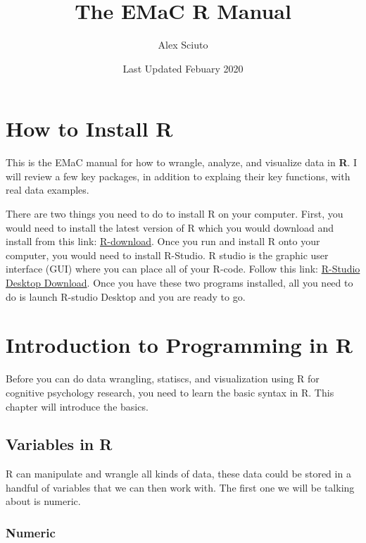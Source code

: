 \documentclass[
]{book}
\title{The EMaC R Manual}
\author{Alex Sciuto}
\date{Last Updated Febuary 2020}
\begin{document}
\maketitle

{
\setcounter{tocdepth}{1}
\tableofcontents
}
\hypertarget{download}{%
\chapter{How to Install R}\label{download}}

This is the EMaC manual for how to wrangle, analyze, and visualize data in \textbf{R}. I will review a few key packages, in addition to explaing their key functions, with real data examples.

There are two things you need to do to install R on your computer. First, you would need to install the latest version of R which you would download and install from this link: \href{https://cloud.r-project.org/}{R-download}. Once you run and install R onto your computer, you would need to install R-Studio. R studio is the graphic user interface (GUI) where you can place all of your R-code. Follow this link: \href{https://rstudio.com/products/rstudio/download/}{R-Studio Desktop Download}. Once you have these two programs installed, all you need to do is launch R-studio Desktop and you are ready to go.

\hypertarget{intro}{%
\chapter{Introduction to Programming in R}\label{intro}}

Before you can do data wrangling, statiscs, and visualization using R for cognitive psychology research, you need to learn the basic syntax in R. This chapter will introduce the basics.

\hypertarget{variables-in-r}{%
\section{Variables in R}\label{variables-in-r}}

R can manipulate and wrangle all kinds of data, these data could be stored in a handful of variables that we can then work with. The first one we will be talking about is numeric.

\hypertarget{numeric}{%
\subsection{Numeric}\label{numeric}}
\end{document}
